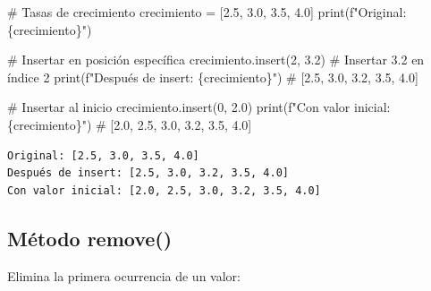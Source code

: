 \documentclass[
  doc,
  floatsintext,
  longtable,
  a4paper,
  nolmodern,
  notxfonts,
  notimes,
  12pt,
  colorlinks=true,linkcolor=blue,citecolor=blue,urlcolor=blue]{apa7}
\newenvironment{Shaded}{\begin{snugshade}}{\end{snugshade}}
\newcommand{\BuiltInTok}[1]{\textcolor[rgb]{0.00,0.23,0.31}{#1}}
\newcommand{\CommentTok}[1]{\textcolor[rgb]{0.37,0.37,0.37}{#1}}
\newcommand{\DecValTok}[1]{\textcolor[rgb]{0.68,0.00,0.00}{#1}}
\newcommand{\FloatTok}[1]{\textcolor[rgb]{0.68,0.00,0.00}{#1}}
\newcommand{\NormalTok}[1]{\textcolor[rgb]{0.00,0.23,0.31}{#1}}
\newcommand{\OperatorTok}[1]{\textcolor[rgb]{0.37,0.37,0.37}{#1}}
\newcommand{\SpecialCharTok}[1]{\textcolor[rgb]{0.37,0.37,0.37}{#1}}
\newcommand{\SpecialStringTok}[1]{\textcolor[rgb]{0.13,0.47,0.30}{#1}}
\begin{document}
\begin{Shaded}
\begin{Highlighting}[]
\CommentTok{\# Tasas de crecimiento}
\NormalTok{crecimiento }\OperatorTok{=}\NormalTok{ [}\FloatTok{2.5}\NormalTok{, }\FloatTok{3.0}\NormalTok{, }\FloatTok{3.5}\NormalTok{, }\FloatTok{4.0}\NormalTok{]}
\BuiltInTok{print}\NormalTok{(}\SpecialStringTok{f"Original: }\SpecialCharTok{\{}\NormalTok{crecimiento}\SpecialCharTok{\}}\SpecialStringTok{"}\NormalTok{)}

\CommentTok{\# Insertar en posición específica}
\NormalTok{crecimiento.insert(}\DecValTok{2}\NormalTok{, }\FloatTok{3.2}\NormalTok{)  }\CommentTok{\# Insertar 3.2 en índice 2}
\BuiltInTok{print}\NormalTok{(}\SpecialStringTok{f"Después de insert: }\SpecialCharTok{\{}\NormalTok{crecimiento}\SpecialCharTok{\}}\SpecialStringTok{"}\NormalTok{)}
\CommentTok{\# [2.5, 3.0, 3.2, 3.5, 4.0]}

\CommentTok{\# Insertar al inicio}
\NormalTok{crecimiento.insert(}\DecValTok{0}\NormalTok{, }\FloatTok{2.0}\NormalTok{)}
\BuiltInTok{print}\NormalTok{(}\SpecialStringTok{f"Con valor inicial: }\SpecialCharTok{\{}\NormalTok{crecimiento}\SpecialCharTok{\}}\SpecialStringTok{"}\NormalTok{)}
\CommentTok{\# [2.0, 2.5, 3.0, 3.2, 3.5, 4.0]}
\end{Highlighting}
\end{Shaded}

\begin{verbatim}
Original: [2.5, 3.0, 3.5, 4.0]
Después de insert: [2.5, 3.0, 3.2, 3.5, 4.0]
Con valor inicial: [2.0, 2.5, 3.0, 3.2, 3.5, 4.0]
\end{verbatim}

\subsection{Método remove()}\label{muxe9todo-remove}

Elimina la primera ocurrencia de un valor:
\end{document}
